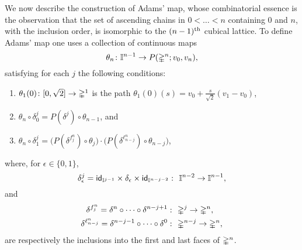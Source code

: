 We now describe the construction of Adams' map, whose combinatorial essence is the observation that the set of ascending chains in $0 < \dots < n$ containing $0$ and $n$, with the inclusion order, is isomorphic to the $(n-1)^{\mathrm{th}}$ cubical lattice.
To define Adams' map one uses a collection of continuous maps
\[
\theta_n \colon \mathbb{I}^{n-1} \to P(\mathbb{\Delta}^n;v_0,v_n),
\]
satisfying for each $j$ the following conditions:
\begin{enumerate}
	\item $\theta_1(0)\colon [0,\sqrt{2}] \to \mathbb{\Delta}^1$ is the path $\theta_1(0)(s) = v_0+ \frac{s}{\sqrt{2}}(v_1-v_0)$,
	\item $\theta_n \circ \delta_0^j = P(\delta^j) \circ \theta_{n-1}$, and
	\item $\theta_n \circ \delta_1^j =
	\big(P(\delta^{f^n_j}) \circ \theta_j\big) \cdot \big(P(\delta^{\ell^n_{n-j}}) \circ \theta_{n-j}\big)$,
\end{enumerate}
where, for $\epsilon \in \{0,1\}$,
\[
\delta_\epsilon^j = \id_{\gcube^{j-1}} \times \delta_\epsilon \times \id_{\gcube^{n-j-2}} \,\colon\ \gcube^{n-2} \to \gcube^{n-1},
\]
and
\[
\begin{split}
	\delta^{f^n_j} = \delta^n \circ \dotsb \circ \delta^{n-j+1} &\,\colon\ \mathbb{\Delta}^j \to \mathbb{\Delta}^n, \\
	\delta^{\ell^n_{n-j}} = \delta^{n-j-1} \circ \dotsb \circ \delta^{0} &\, \colon\ \mathbb{\Delta}^{n-j} \to \mathbb{\Delta}^n,
\end{split}
\]
are respectively the inclusions into the first and last faces of $\mathbb{\Delta}^n$.

